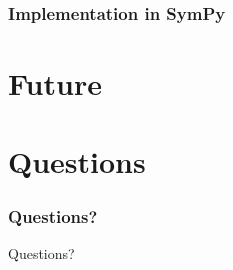\documentclass{beamer}
\numberwithin{equation}{section} %
\begin{document}
\begin{frame}
    \frametitle{Implementation in SymPy}
    \begin{figure}[t!]
    \end{figure}
\end{frame}
\section{Future}

\begin{frame}

\end{frame}


\section{Questions}

\begin{frame}
    \frametitle{Questions?}
    \huge{Questions?}
\end{frame}
\end{document}
